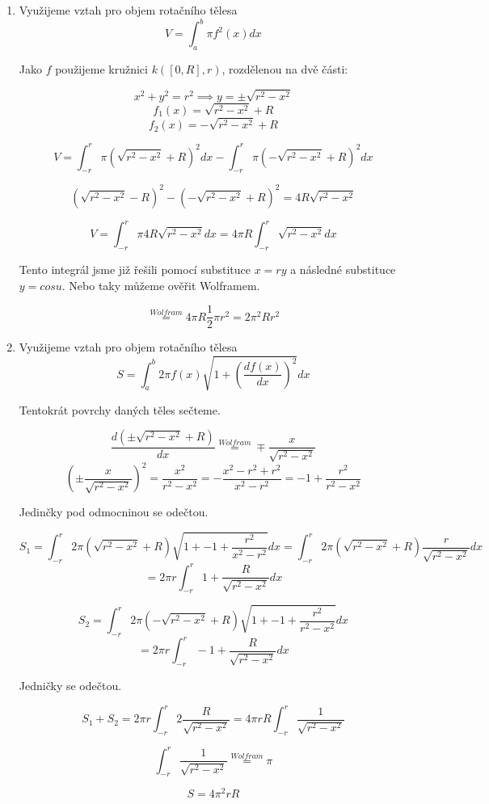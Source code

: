 \documentclass[10pt,a4paper]{article}
\theoremstyle{plain}
\theoremstyle{definition}
\begin{document}
\begin{enumerate}[label=(\alph*)]
\begin{enumerate}
\item Využijeme vztah pro objem rotačního tělesa
\[ V = \int_a^b \pi f^2(x) d x \]

Jako $f$ použijeme kružnici $k([0, R], r)$, rozdělenou na dvě části:

\[x^2 + y^2 = r^2 \implies y = \pm \sqrt{r^2 - x^2}\]
\[ f_1(x) = \sqrt{r^2 - x^2} + R \]
\[ f_2(x) = -\sqrt{r^2 - x^2} + R \]

\[ V = \int_{-r}^{r} \pi \left(\sqrt{r^2 - x^2} + R \right)^2 d x - \int_{-r}^{r} \pi\left(-\sqrt{r^2 - x^2} + R \right)^2 d x \]

\hfill

\[ \left(\sqrt{r^2 - x^2} - R \right)^2 - \left(-\sqrt{r^2 - x^2} + R \right)^2 =  4R\sqrt{r^2-x^2}  \]

\[ V = \int_{-r}^{r} \pi 4R\sqrt{r^2 - x^2}  d x 
	= 4 \pi R \int_{-r}^{r} \sqrt{r^2 - x^2} d x 
\]

Tento integrál jsme již řešili pomocí substituce $x = ry$ a následné substituce $y = cos u$. Nebo taky můžeme ověřit Wolframem.
	
\[  \overset{Wolfram}{=} 4 \pi R \frac12 \pi r^2 = 2 \pi^2 R r^2
\]

\item Využijeme vztah pro objem rotačního tělesa
\[ S = \int_a^b 2\pi f(x) \sqrt{1 + \left( \frac{df(x)}{dx}\right)^2} d x \] 

Tentokrát povrchy daných těles sečteme.

 \[ \frac{d(\pm \sqrt{r^2 - x^2} + R)}{dx} \overset{Wolfram}{=} \mp \frac{x}{ \sqrt{r^2 - x^2}} \]
 \[ \left( \pm \frac{x}{ \sqrt{r^2 - x^2}} \right)^2 = \frac{x^2}{r^2-x^2} = - \frac{x^2 - r^2 + r^2}{x^2 - r^2} = - 1 + \frac{r^2}{ r^2 - x^2}\]
 
 Jedinčky pod odmocninou se odečtou.
 
 \[ S_1 = \int_{-r}^{r} 2\pi \left(\sqrt{r^2 - x^2} + R\right)  \sqrt{1 + - 1 + \frac{r^2}{x^2 - r^2}} d x
     = \int_{-r}^{r} 2\pi \left(\sqrt{r^2 - x^2} + R\right)  \frac{r}{\sqrt{r^2 - x^2}} d x    
  \] \[
 =  2\pi r \int_{-r}^{r} 1 + \frac{R}{\sqrt{r^2 - x^2}}   d x    
  \]
 
 
  \[ S_2 = \int_{-r}^{r} 2\pi \left(-\sqrt{r^2 - x^2} + R\right)  \sqrt{1 + - 1 + \frac{r^2}{r^2 - x^2}} d x\] \[
 =  2\pi r \int_{-r}^{r} -1 + \frac{R}{\sqrt{r^2 - x^2}}   d x    
  \]
  
  
\hfill

Jedničky se odečtou. 


\[ S_1 + S_2 = 2\pi r  \int_{-r}^{r}  2 \frac{R}{\sqrt{r^2 - x^2}} 
= 4\pi r R  \int_{-r}^{r} \frac{1}{\sqrt{r^2 - x^2}} \]

\[  \int_{-r}^{r} \frac{1}{\sqrt{r^2 - x^2}} \overset{Wolfram}{=} \pi \]

\[ S = 4\pi^2 r R\]
 

\end{enumerate}




\end{enumerate}
\end{document}
